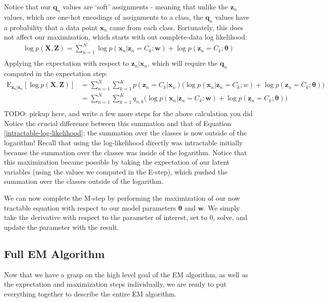 Notice that our $\textbf{q}_n$ values are `soft' assignments - meaning that unlike the $\textbf{z}_n$ values, which are one-hot encodings of assignments to a class, the $\textbf{q}_n$ values have a probability that a data point $\textbf{x}_n$ came from each class. Fortunately, this does not affect our maximization, which starts with out complete-data log likelihood:
\begin{align*}
    \log p(\textbf{X}, \textbf{Z}) = \sum_{n=1}^{N} \log p(\textbf{x}_n | \textbf{z}_n = C_k; \textbf{w}) + \log p(\textbf{z}_n = C_k; \boldsymbol{\theta}) \\
\end{align*}
Applying the expectation with respect to $\textbf{z}_n | \textbf{x}_n$, which will require the $\textbf{q}_n$ computed in the expectation step:
\begin{align*}
    \mathrm{E}_{\textbf{z}_n | \textbf{x}_n} [\log p(\textbf{X}, \textbf{Z})] &= \sum_{n=1}^{N} \sum_{k=1}^{K} p(\textbf{z}_n = C_k | \textbf{x}_n) \big( \log p(\textbf{x}_n | \textbf{z}_n = C_k; w) + \log p(\textbf{z}_n = C_k; \boldsymbol{\theta}) \big) \\
    &= \sum_{n=1}^{N} \sum_{k=1}^{K} q_{n, k} \big( \log p(\textbf{x}_n | \textbf{z}_n = C_k; \textbf{w}) + \log p(\textbf{z}_n = C_k; \boldsymbol{\theta}) \big) \\
\end{align*}
TODO: pickup here, and write a few more steps for the above calculation you did
Notice the crucial difference between this summation and that of Equation \ref{intractable-log-likelihood}: the summation over the classes is now outside of the logarithm! Recall that using the log-likelihood directly was intractable initially because the summation over the classes was inside of the logarithm. Notice that this maximization became possible by taking the expectation of our latent variables (using the values we computed in the E-step), which pushed the summation over the classes outside of the logarithm.

We can now complete the M-step by performing the maximization of our now tractable equation with respect to our model parameters $\boldsymbol{\theta}$ and $\textbf{w}$. We simply take the derivative with respect to the parameter of interest, set to 0, solve, and update the parameter with the result.

\subsection{Full EM Algorithm}
Now that we have a grasp on the high level goal of the EM algorithm, as well as the expectation and maximization steps individually, we are ready to put everything together to describe the entire EM algorithm.

